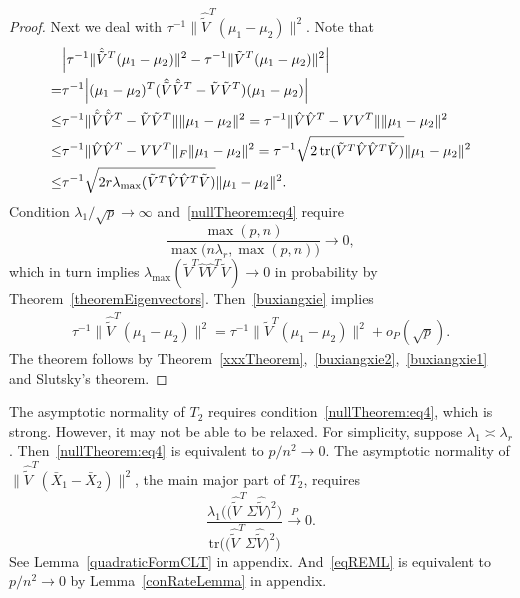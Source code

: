 \begin{proof}
Next we deal with $    \tau^{-1}\|\hat{\tilde{V}}^T (\mu_1-\mu_2)\|^2$. Note that
    \begin{equation}\label{buxiangxie}
        \begin{split}
            &\Big|\tau^{-1}\|\hat{\tilde{V}}^T (\mu_1-\mu_2)\|^2-\tau^{-1}\|\tilde{V}^T (\mu_1-\mu_2)\|^2\Big|\\
            =&\tau^{-1}\Big|(\mu_1-\mu_2)^T(\hat{\tilde{V}}\hat{\tilde{V}}^T -\tilde{V}\tilde{V}^T) (\mu_1-\mu_2)\Big|\\
            \leq&
            \tau^{-1}\|\hat{\tilde{V}}\hat{\tilde{V}}^T -\tilde{V}\tilde{V}^T\| \|\mu_1-\mu_2\|^2
            =\tau^{-1}\|\hat{V}\hat{V}^T -VV^T\| \|\mu_1-\mu_2\|^2\\
            \leq&\tau^{-1}\|\hat{V}\hat{V}^T -VV^T\|_F \|\mu_1-\mu_2\|^2
            =\tau^{-1}\sqrt{2\operatorname{tr}(\tilde{V}^T\hat{V}\hat{V}^T \tilde{V})} \|\mu_1-\mu_2\|^2\\
            \leq& \tau^{-1}\sqrt{2r\lambda_{\max}(\tilde{V}^T\hat{V}\hat{V}^T \tilde{V})} \|\mu_1-\mu_2\|^2.
        \end{split}
    \end{equation}
Condition ${\lambda_1}/{\sqrt{p}}\to \infty$ and~\eqref{nullTheorem:eq4} require
$$
        \frac{\max(p,n)}{\max\big(n\lambda_r,\max(p,n)\big)}\to 0,
    $$
    which in turn implies $\lambda_{\max}(\tilde{V}^T\hat{V}\hat{V}^T \tilde{V})\to 0$ in probability by Theorem~\ref{theoremEigenvectors}.
    Then~\eqref{buxiangxie} implies
    \begin{equation}\label{buxiangxie1}
        \begin{split}
            \tau^{-1}\|\hat{\tilde{V}}^T (\mu_1-\mu_2)\|^2=\tau^{-1}\|\tilde{V}^T (\mu_1-\mu_2)\|^2+o_P(\sqrt{p}).
        \end{split}
    \end{equation}
    The theorem follows by Theorem~\ref{xxxTheorem},~\eqref{buxiangxie2},~\eqref{buxiangxie1} and Slutsky's theorem.

\end{proof}


 



The asymptotic normality of $T_2$ requires condition~\eqref{nullTheorem:eq4}, which is strong.
However, it may not be able to be relaxed.
For simplicity, suppose $\lambda_1\asymp \lambda_r$. Then~\eqref{nullTheorem:eq4} is equivalent to $p/n^2\to 0$.
The asymptotic normality of $\|\hat{\tilde{V}}^T(\bar{X}_1-\bar{X}_2)\|^2$, the main major part of $T_2$, requires 
\begin{equation}\label{eqREML}
    \frac{\lambda_1\big(\big(\hat{\tilde{V}}^T \Sigma \hat{\tilde{V}}\big)^2\big)}{\mathrm{tr}\big(\big(\hat{\tilde{V}}^T \Sigma \hat{\tilde{V}}\big)^2\big)
}\xrightarrow{P} 0.
\end{equation}
See Lemma~\ref{quadraticFormCLT} in appendix. And~\eqref{eqREML} is equivalent to $p/n^2\to 0$ by Lemma~\ref{conRateLemma} in appendix.




